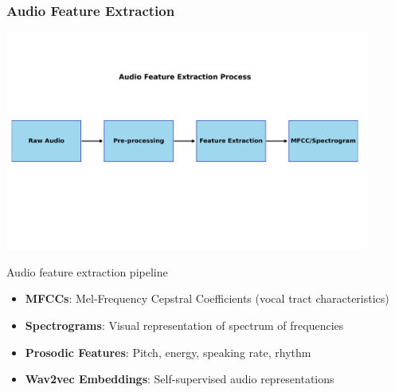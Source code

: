 \documentclass{beamer}
\begin{document}
\begin{frame}
\frametitle{Audio Feature Extraction}
\begin{center}
\includegraphics[width=0.9\textwidth]{figures/audio_feature_extraction.png}
\caption{Audio feature extraction pipeline}
\end{center}

\begin{itemize}
    \item \textbf{MFCCs}: Mel-Frequency Cepstral Coefficients (vocal tract characteristics)
    \item \textbf{Spectrograms}: Visual representation of spectrum of frequencies
    \item \textbf{Prosodic Features}: Pitch, energy, speaking rate, rhythm
    \item \textbf{Wav2vec Embeddings}: Self-supervised audio representations
\end{itemize}
\end{frame}
\end{document}
